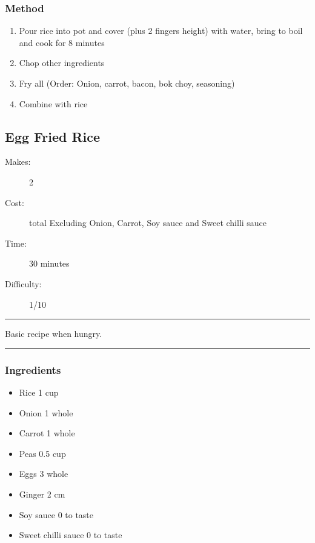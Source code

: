 \documentclass[]{article}
\begin{document}
\subsubsection*{\Large Method}
\begin{enumerate}[font=\huge\color{accent}]
	\item Pour rice into pot and cover (plus 2 fingers height) with water, bring to boil and cook for 8 minutes
	\item Chop other ingredients
	\item Fry all (Order: Onion, carrot, bacon, bok choy, seasoning)
	\item Combine with rice
\end{enumerate}
\newpage
{}\label{rec:Egg Fried Rice}
\subsection*{\center\huge Egg Fried Rice}
\begin{description}
\item[Makes:] 2 
\item[Cost:]  total Excluding Onion, Carrot, Soy sauce and Sweet chilli sauce
\item[Time:] 30 minutes
\item[Difficulty:] 1/10
\end{description}
\vspace{0.2cm}\hrule\vspace{0.5cm}
\begin{adjustwidth}{0.5 cm}{0.5 cm}

Basic recipe when hungry. \hfill{}\color{black}

\end{adjustwidth}
\vspace{0.5cm}\hrule
\subsubsection*{\Large Ingredients}
\begin{multicols}{2}
\begin{itemize}
 \item Rice \hfill 1 cup
 \item Onion \hfill 1 whole
 \item Carrot \hfill 1 whole
 \item Peas \hfill 0.5 cup
 \item Eggs \hfill 3 whole
 \item Ginger \hfill 2 cm
 \item Soy sauce \hfill 0 to taste
 \item Sweet chilli sauce \hfill 0 to taste
\end{itemize}
\end{multicols}
\end{document}
